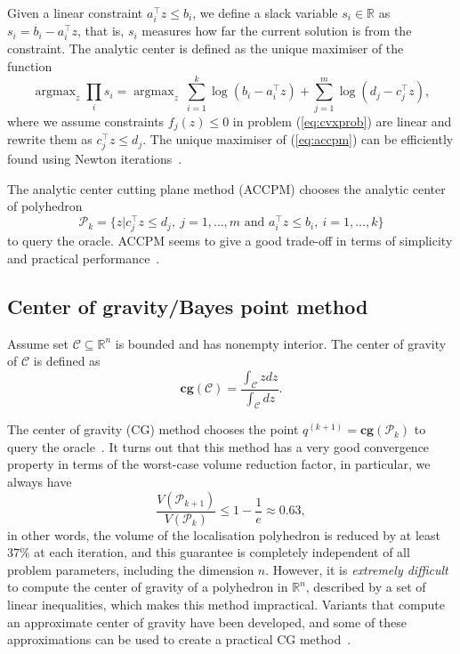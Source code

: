 \documentclass[9pt]{extarticle}
\DeclareMathOperator*{\argmax}{argmax}
\begin{document}
Given a linear constraint $a_i^\top z \le b_i$, we define a slack variable $s_i \in \mathbb{R}$ as $s_i = b_i - a_i^\top z$,
that is, $s_i$ measures how far the current solution is from the constraint.
The analytic center is defined as the unique maximiser of the function~\cite{wulff2013analytic}
\begin{equation}
\label{eq:accpm}
\argmax_z \prod_i s_i = \argmax_z ~ \sum_{i=1}^k \log(b_i - a_i^\top z) + \sum_{j=1}^m \log(d_j - c_j^\top z),
\end{equation}
where we assume constraints $f_j(z) \le 0$ in problem (\ref{eq:cvxprob}) are linear and rewrite them as $c_j^\top z \le d_j$.
The unique maximiser of (\ref{eq:accpm}) can be efficiently found using Newton iterations~\cite{goffin2002convex}.

The analytic center cutting plane method (ACCPM) chooses the analytic center of polyhedron 
\begin{equation*}
\mathcal{P}_k = \{ z | c_j^\top z \le d_j, ~ j=1, \dots, m \text{~and~} a_i^\top z \le b_i, ~ i=1, \dots, k \}
\end{equation*}
to query the oracle.
ACCPM seems to give a good trade-off in terms of simplicity and practical performance~\cite{boydlocalization}.


\subsection{Center of gravity/Bayes point method}
\label{sec:cg}

Assume set $\mathcal{C} \subseteq \mathbb{R}^n$ is bounded and has nonempty interior. 
The center of gravity of $\mathcal{C}$ is defined as
\begin{equation}
\textbf{cg}(\mathcal{C}) = \frac{\int_\mathcal{C} z dz}{\int_\mathcal{C} dz}.
\end{equation}

The center of gravity (CG) method chooses the point $q^{(k+1)} = \textbf{cg}(\mathcal{P}_{k})$ to query the oracle~\cite{louche2015cutting}.
It turns out that this method has a very good convergence property in terms of the worst-case volume reduction factor,
in particular, we always have
\begin{equation}
\frac{V(\mathcal{P}_{k+1})}{V(\mathcal{P}_{k})} \le 1 - \frac{1}{e} \approx 0.63,
\end{equation}
in other words, the volume of the localisation polyhedron is reduced by at least $37\%$ at each iteration,
and this guarantee is completely independent of all problem parameters, including the dimension $n$.
However, it is \textit{extremely difficult} to compute the center of gravity of a polyhedron in $\mathbb{R}^n$, described by a set of linear inequalities,
which makes this method impractical.
Variants that compute an approximate center of gravity have been developed, and some of these approximations can be used to create a practical CG method~\cite{boydlocalization}.
\end{document}
